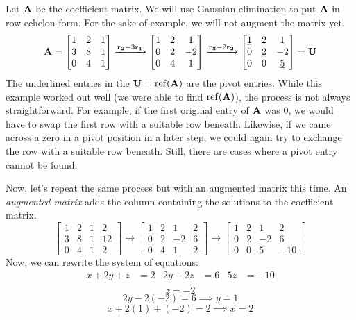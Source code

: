 \documentclass[../main.tex]{subfiles}
\begin{document}
\begin{solution} \label{sol:linear_sys_1}
	Let $\mathbf{A}$ be the coefficient matrix. We will use Gaussian elimination to
	put $\mathbf{A}$ in row echelon form. For the sake of example, we will not augment
	the matrix yet.
	\[\mathbf{A}=\begin{bmatrix}1&2&1\\3&8&1\\0&4&1\end{bmatrix}
		\xrightarrow{\mathbf{r_2}-3\mathbf{r_1}} \begin{bmatrix}1&2&1\\0&2&-2\\0&4&1\end{bmatrix}
		\xrightarrow{\mathbf{r_3}-2\mathbf{r_2}} \begin{bmatrix}\underline{1}&2&1\\0&\underline{2}&-2\\0&0&\underline{5}\end{bmatrix}=\mathbf{U} \]
	The underlined entries in the $\mathbf{U}=\operatorname{ref}(\mathbf{A})$ are the pivot entries.
	While this example worked out well (we were able to find $\operatorname{ref}(\mathbf{A})$),
	the process is not always straightforward. For example, if the first original
	entry of $\mathbf{A}$ was $0$, we would have to swap the first row with a suitable row beneath.
	Likewise, if we came across a zero in a pivot position in a later step, we could again try to exchange
	the row with a suitable row beneath. Still, there are cases where a pivot entry cannot be found.

	Now, let's repeat the same process but with an augmented matrix this time.
	An \textit{augmented matrix} adds the column containing the solutions to
	the coefficient matrix.
	\[\left[\begin{array}{rrr|r}
				1 & 2 & 1 & 2  \\
				3 & 8 & 1 & 12 \\
				0 & 4 & 1 & 2
			\end{array}\right]\to
		\left[\begin{array}{rrr|r}
				1 & 2 & 1  & 2 \\
				0 & 2 & -2 & 6 \\
				0 & 4 & 1  & 2
			\end{array}\right]\to
		\left[\begin{array}{rrr|r}
				1 & 2 & 1  & 2   \\
				0 & 2 & -2 & 6   \\
				0 & 0 & 5  & -10
			\end{array}\right]\]
	Now, we can rewrite the system of equations:
	\begin{align*}
		x+2y+z & =2 & 2y-2z & =6 & 5z & =-10 \\
	\end{align*}
	\[z=-2\]
	\[2y-2(-2)=6\implies y=1\]
	\[x+2(1)+(-2)=2\implies x=2\]
	\flushright
	\qedsymbol
\end{solution}
\end{document}
